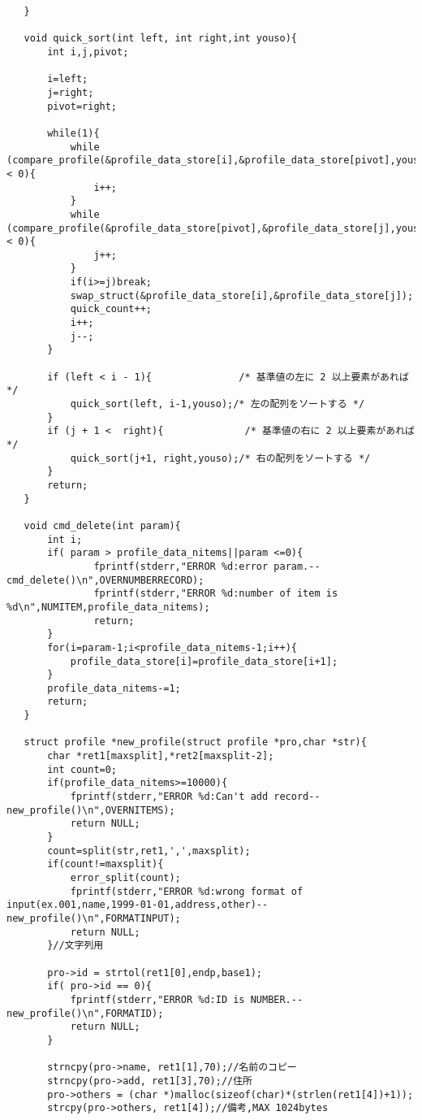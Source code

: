 \documentclass[a4j,11pt]{jarticle}
\begin{document}
\begin{lstlisting}
   }
   
   void quick_sort(int left, int right,int youso){
       int i,j,pivot;
       
       i=left; 
       j=right;
       pivot=right;
       
       while(1){
           while (compare_profile(&profile_data_store[i],&profile_data_store[pivot],youso) < 0){
               i++;
           }
           while (compare_profile(&profile_data_store[pivot],&profile_data_store[j],youso) < 0){
               j++;
           }
           if(i>=j)break;
           swap_struct(&profile_data_store[i],&profile_data_store[j]);
           quick_count++;
           i++;
           j--;
       }
       
       if (left < i - 1){               /* 基準値の左に 2 以上要素があれば */
           quick_sort(left, i-1,youso);/* 左の配列をソートする */
       }
       if (j + 1 <  right){              /* 基準値の右に 2 以上要素があれば */
           quick_sort(j+1, right,youso);/* 右の配列をソートする */
       }
       return;
   }
   
   void cmd_delete(int param){
       int i;
       if( param > profile_data_nitems||param <=0){
               fprintf(stderr,"ERROR %d:error param.--cmd_delete()\n",OVERNUMBERRECORD);
               fprintf(stderr,"ERROR %d:number of item is %d\n",NUMITEM,profile_data_nitems);
               return;
       }
       for(i=param-1;i<profile_data_nitems-1;i++){
           profile_data_store[i]=profile_data_store[i+1];
       }
       profile_data_nitems-=1;
       return;
   }
   
   struct profile *new_profile(struct profile *pro,char *str){
       char *ret1[maxsplit],*ret2[maxsplit-2];
       int count=0;
       if(profile_data_nitems>=10000){
           fprintf(stderr,"ERROR %d:Can't add record--new_profile()\n",OVERNITEMS);
           return NULL;
       }
       count=split(str,ret1,',',maxsplit);
       if(count!=maxsplit){
           error_split(count);
           fprintf(stderr,"ERROR %d:wrong format of input(ex.001,name,1999-01-01,address,other)--new_profile()\n",FORMATINPUT);
           return NULL;
       }//文字列用
   
       pro->id = strtol(ret1[0],endp,base1);
       if( pro->id == 0){
           fprintf(stderr,"ERROR %d:ID is NUMBER.--new_profile()\n",FORMATID);
           return NULL;
       }
   
       strncpy(pro->name, ret1[1],70);//名前のコピー
       strncpy(pro->add, ret1[3],70);//住所
       pro->others = (char *)malloc(sizeof(char)*(strlen(ret1[4])+1));
       strcpy(pro->others, ret1[4]);//備考,MAX 1024bytes
   

\end{lstlisting}
\end{document}

